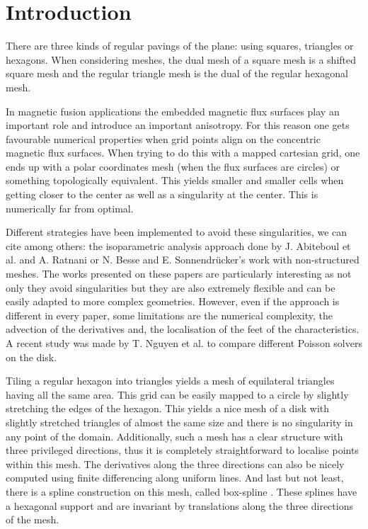 \documentclass[proc]{edpsmath}
\begin{document}
\maketitle


\section*{Introduction}


There are three kinds of regular pavings of the plane: using squares, triangles or hexagons. When considering meshes, the dual mesh of a square mesh is a shifted square mesh and the regular triangle mesh is the dual of the regular hexagonal mesh.

In magnetic fusion applications the embedded magnetic flux surfaces play an important role and introduce an important anisotropy\cite{Angelino2009}. For this reason one gets favourable numerical properties when grid points align on the concentric magnetic flux surfaces. When trying to do this with a mapped cartesian grid, one ends up with a polar coordinates mesh (when the flux surfaces are circles) or something topologically equivalent. This yields smaller and smaller cells when getting closer to the center as well as a singularity at the center. This is numerically far from optimal. 

Different strategies have been implemented to avoid these singularities, we can cite among others: the isoparametric analysis approach done by J. Abiteboul et al. \cite{abiteboul2011solving} and A. Ratnani \cite{ratnani2011isogeometric} or N. Besse and E. Sonnendr\"{u}cker's work with non-structured meshes\cite{Besse2003341}. The works presented on these papers are particularly interesting as not only they avoid singularities but they are also extremely flexible and can be easily adapted to more complex geometries. However, even if the approach is different in every paper, some limitations are the numerical complexity, the advection of the derivatives and, the localisation of the feet of the characteristics. 
A recent study was made by T. Nguyen et al.\cite{axioms3020280} to compare different Poisson solvers on the disk. 

Tiling a regular hexagon into triangles yields a mesh of equilateral triangles having all the same area\cite{Sadourny1968}. This grid can be easily mapped to a circle by slightly stretching the edges of the hexagon. This yields a nice mesh of a disk with slightly stretched triangles of almost the same size and there is no singularity in any point of the domain. 
Additionally, such a mesh has a clear structure with three privileged directions, thus it is completely straightforward to localise points within this mesh. The derivatives along the three directions can also be nicely computed using finite differencing along uniform lines. 
And last but not least, there is a spline construction on this mesh, called box-spline \cite{Condat2008}. These splines have a hexagonal support and are invariant by translations along the three directions of the mesh. 
\end{document}

